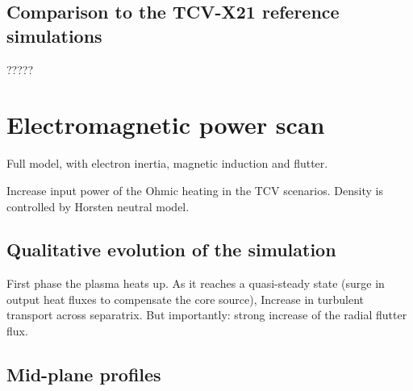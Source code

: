 \subsection{Comparison to the TCV-X21 reference simulations} 

????? 



\section{Electromagnetic power scan}

Full model, with electron inertia, magnetic induction and flutter. 

Increase input power of the Ohmic heating in the TCV scenarios. Density is controlled by Horsten neutral model.

\subsection{Qualitative evolution of the simulation}

First phase the plasma heats up. As it reaches a quasi-steady state (surge in output heat fluxes to compensate the core source), Increase in turbulent transport across separatrix. But importantly: strong increase of the radial flutter flux.

\subsection{Mid-plane profiles}


